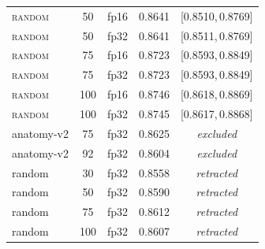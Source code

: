 \begin{tabular}{lcccc}
\textsc{random} & 50 & fp16 & 0.8641 & [0.8510,\,0.8769] \\
\textsc{random} & 50 & fp32 & 0.8641 & [0.8511,\,0.8769] \\
\textsc{random} & 75 & fp16 & 0.8723 & [0.8593,\,0.8849] \\
\textsc{random} & 75 & fp32 & 0.8723 & [0.8593,\,0.8849] \\
\textsc{random} & 100 & fp16 & 0.8746 & [0.8618,\,0.8869] \\
\textsc{random} & 100 & fp32 & 0.8745 & [0.8617,\,0.8868] \\
anatomy-v2 & 75 & fp32 & 0.8625 & \emph{excluded} \\
anatomy-v2 & 92 & fp32 & 0.8604 & \emph{excluded} \\
random & 30 & fp32 & 0.8558 & \emph{retracted} \\
random & 50 & fp32 & 0.8590 & \emph{retracted} \\
random & 75 & fp32 & 0.8612 & \emph{retracted} \\
random & 100 & fp32 & 0.8607 & \emph{retracted} \\
\bottomrule
\end{tabular}
